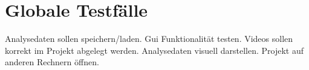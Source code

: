 \chapter{Globale Testfälle}
\setcounter{enumi}{0}
 Analysedaten sollen speichern/laden.
 Gui Funktionalität testen.
 Videos sollen korrekt im Projekt abgelegt werden.
 Analysedaten visuell darstellen.
 Projekt auf anderen Rechnern öffnen.
